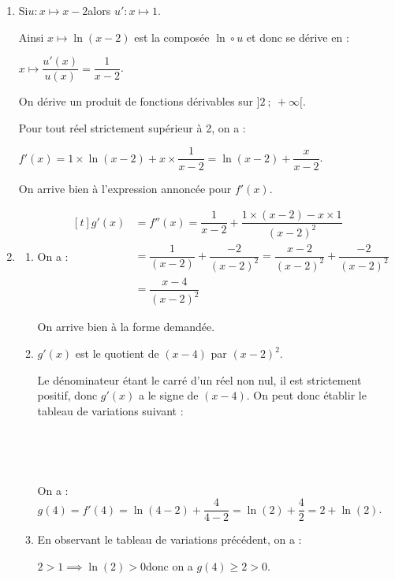 \begin{enumerate}
	\item Si\quad $u : x \longmapsto x - 2$\quad alors $u' : x \longmapsto 1$.

Ainsi \quad $x \longmapsto \ln(x-2)$ \quad est la composée $\ln \circ u$ et donc se dérive en :

$x \longmapsto \dfrac{u'(x)}{u(x)} = \dfrac{1}{x-2}$.

On dérive un produit de fonctions dérivables sur $]2~;~+\infty[$.

Pour tout réel strictement supérieur à 2, on a :

$f'(x) = 1 \times \ln(x - 2) + x \times \dfrac{1}{x - 2} = \ln(x-2) + \dfrac{x}{x - 2}$.

On arrive bien à l'expression annoncée pour $f'(x)$.

	\item \begin{enumerate}
		\item On a :\quad $\begin{aligned}[t]
			g'(x) &= f''(x) = \dfrac{1}{x - 2} + \dfrac{1 \times (x-2) - x \times 1}{(x-2)^2}\\
			&= \dfrac{1}{(x-2)} + \dfrac{-2}{(x-2)^2} = \dfrac{x-2}{(x-2)^2} + \dfrac{-2}{(x-2)^2}\\
			& = \dfrac{x - 4}{(x-2)^2}
		\end{aligned}$

On arrive bien à la forme demandée.

		\item $g'(x)$ est le quotient de $(x-4)$ par $(x-2)^2$.

Le dénominateur étant le carré d'un réel non nul, il est strictement positif, donc $g'(x)$ a le signe de $(x - 4)$. On peut donc établir le tableau de variations suivant :

\hfill~\hfill~

On a :\quad $g(4) = f'(4) = \ln(4 - 2) + \dfrac{4}{4 - 2} = \ln(2) + \dfrac{4}{2} = 2 + \ln (2)$.

		\item En observant le tableau de variations précédent, on a :

$2 > 1 \implies \ln(2) > 0$\quad donc on a $g(4) \geqslant 2 > 0$.


\end{enumerate}
\end{enumerate}
